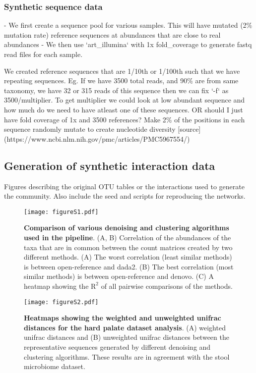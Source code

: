   \subsubsection{Synthetic sequence data}
  - We first create a sequence pool for various samples. This will have mutated (2\% mutation rate) reference sequences at abundances that are close to real abundances
  - We then use `art_illumina` with 1x fold_coverage to generate fastq read files for each sample.

    We created reference sequences that are 1/10th or 1/100th such that we have repeating sequences. Eg. If we have 3500 total reads, and 90\% are from same taxonomy, we have 32 or 315 reads of this sequence then we can fix `-f` as 3500/multiplier. To get multiplier we  could look at low abundant sequence and how much do we need to have atleast one of these sequences. OR should I just have fold coverage of 1x and 3500 references? Make 2\% of the positions in each sequence randomly mutate to create nucleotide diversity [source](https://www.ncbi.nlm.nih.gov/pmc/articles/PMC5967554/)

  \subsection{Generation of synthetic interaction data}
  Figures describing the original OTU tables or the interactions used to generate the community. Also include the seed and scripts for reproducing the networks.

  \begin{figure}[h]
  \centering
  \texttt{[image: figureS1.pdf]}
  \caption{
    \textbf{Comparison of various denoising and clustering algorithms used in the pipeline}.
    (A, B) Correlation of the abundances of the taxa that are in common between the count matrices created by two different methods.
    (A) The worst correlation (least similar methods) is between open-reference and dada2.
    (B) The best correlation (most similar methods) is between open-reference and denovo.
    (C) A heatmap showing the $\mathrm{R}^2$ of all pairwise comparisons of the methods.
  }
  \label{fig:figureS1}
\end{figure}

  \begin{figure}[h]
    \centering
    \texttt{[image: figureS2.pdf]}
    \caption{
      \textbf{Heatmaps showing the weighted and unweighted unifrac distances for the hard palate dataset analysis}.
      (A) weighted unifrac distances and (B) unweighted unifrac distances between the representative sequences generated by different denoising and clustering algorithms.
      These results are in agreement with the stool microbiome dataset.
    }
    \label{fig:figureS2}
  \end{figure}

